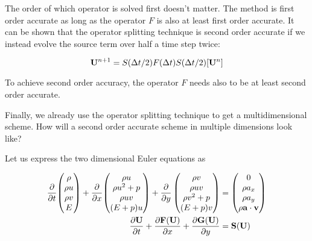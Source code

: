 The order of which operator is solved first doesn't matter.
The method is first order accurate as long as the operator $F$ is also at least first order accurate.
It can be shown that the operator splitting technique is second order accurate if we instead evolve the source term over half a time step twice:

\begin{equation}
	\mathbf{U}^{n+1} = S(\Delta t / 2)  F(\Delta t) S(\Delta t / 2) [\mathbf{U}^n]
\end{equation}

To achieve second order accuracy, the operator $F$ needs also to be at least second order accurate.



Finally, we already use the operator splitting technique to get a multidimensional scheme.
How will a second order accurate scheme in multiple dimensions look like?

Let us express the two dimensional Euler equations as






\begin{align}
	\deldt{ 
		\begin{pmatrix}
			\rho \\ \rho u \\ \rho v \\ E
		\end{pmatrix}
		}
	+ \deldx {
		\begin{pmatrix}
			\rho u\\
			\rho u^2  + p\\
			\rho uv\\
			(E + p) u
		\end{pmatrix}
	} 
	+ \frac{\del}{\del y}
		\begin{pmatrix}
			\rho v\\
			\rho uv\\
			\rho v^2  + p\\
			(E + p) v
		\end{pmatrix}
	&= 	\begin{pmatrix}
			0\\
			\rho a_x\\
			\rho a_y\\
			\rho \mathbf{a} \cdot \V
		\end{pmatrix}\\
%
    \DELDT{ \U } + \DELDX{\F(\U)} + \frac{\del \mathbf{G}(\U)}{\del y} &= \mathbf{S}(\U)
\end{align}


